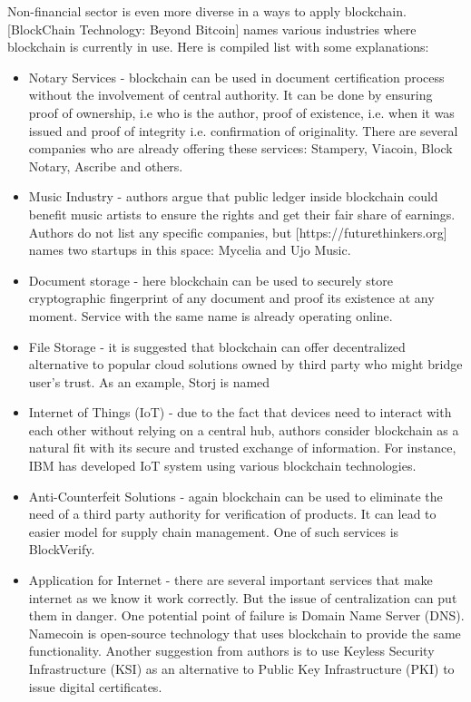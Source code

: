 \documentclass[conference,compsoc]{IEEEtran}
\begin{document}
Non-financial sector is even more diverse in a ways to apply blockchain.
[BlockChain Technology: Beyond Bitcoin] names various industries where blockchain is currently in use. 
Here is compiled list with some explanations:
\begin{itemize}
    \item Notary Services - blockchain can be used in document certification process without the involvement of central authority. 
    It can be done by ensuring proof of ownership, i.e who is the author, proof of existence, i.e. when it was issued and proof of integrity i.e. confirmation of originality.
    There are several companies who are already offering these services: Stampery, Viacoin, Block Notary, Ascribe and others.
    
    \item Music Industry - authors argue that public ledger inside blockchain could benefit music artists to ensure the rights and get their fair share of earnings. 
    Authors do not list any specific companies, but [https://futurethinkers.org] names two startups in this space: Mycelia and Ujo Music.
    
    \item Document storage - here blockchain can be used to securely store cryptographic fingerprint of any document and proof its existence at any moment. 
    Service with the same name is already operating online.
    
    \item File Storage - it is suggested that blockchain can offer decentralized alternative to popular cloud solutions owned by third party who might bridge user's trust. 
    As an example, Storj is named
    
    \item Internet of Things (IoT) - due to the fact that devices need to interact with each other without relying on a central hub, authors consider blockchain as a natural fit with its secure and trusted exchange of information. 
    For instance, IBM has developed IoT system using various blockchain technologies.
    
    \item Anti-Counterfeit Solutions - again blockchain can be used to eliminate the need of a third party authority for verification of products.
    It can lead to easier model for supply chain management.
    One of such services is BlockVerify.
    
    \item Application for Internet - there are several important services that make internet as we know it work correctly. 
    But the issue of centralization can put them in danger. 
    One potential point of failure is Domain Name Server (DNS). 
    Namecoin is open-source technology that uses blockchain to provide the same functionality.
    Another suggestion from authors is to use Keyless Security Infrastructure (KSI) as an alternative to Public Key Infrastructure (PKI) to issue digital certificates. 
\end{itemize}
\end{document}
